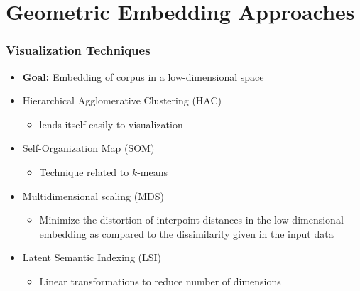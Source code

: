 \documentclass{beamer}
\begin{document}





\section{Geometric Embedding Approaches}

\begin{frame}
  \frametitle{Visualization Techniques}

  \begin{itemize}
  \item \textbf{Goal:} Embedding of corpus in a low-dimensional space
  \item Hierarchical Agglomerative Clustering (HAC)
    \begin{itemize}
    \item lends itself easily to visualization
    \end{itemize}
  \item Self-Organization Map (SOM)
    \begin{itemize}
    \item Technique related to $k$-means
    \end{itemize}
  \item Multidimensional scaling (MDS)
    \begin{itemize}
    \item Minimize the distortion of interpoint distances in the
      low-dimensional embedding as compared to the dissimilarity given in the
      input data
    \end{itemize}
  \item Latent Semantic Indexing (LSI)
    \begin{itemize}
    \item Linear transformations to reduce number of dimensions
    \end{itemize}
  \end{itemize}

\end{frame}
\end{document}
